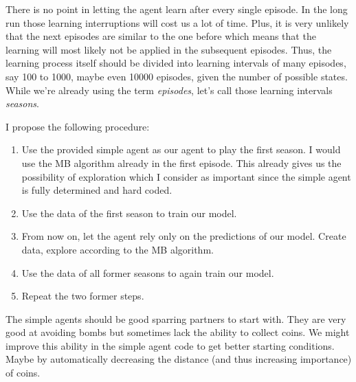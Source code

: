 \documentclass[12pt]{report}
\begin{document}
There is no point in letting the agent learn after every single episode. In the long run those learning interruptions will cost us a lot of time. Plus, it is very unlikely that the next episodes are similar to the one before which means that the learning will most likely not be applied in the subsequent episodes. Thus, the learning process itself should be divided into learning intervals of many episodes, say 100 to 1000, maybe even 10000 episodes, given the number of possible states. While we're already using the term \textit{episodes}, let's call those learning intervals \textit{seasons}.\par
I propose the following procedure:
\begin{enumerate}
	\item Use the provided simple agent as our agent to play the first season. I would use the MB algorithm already in the first episode. This already gives us the possibility of exploration which I consider as important since the simple agent is fully determined and hard coded.
	\item Use the data of the first season to train our model. 
	\item From now on, let the agent rely only on the predictions of our model. Create data, explore according to the MB algorithm. 
	\item Use the data of all former seasons to again train our model.
	\item Repeat the two former steps.
\end{enumerate}
The simple agents should be good sparring partners to start with. They are very good at avoiding bombs but sometimes lack the ability to collect coins. We might improve this ability in the simple agent code to get better starting conditions. Maybe by automatically decreasing the distance (and thus increasing importance) of coins.
\end{document}
